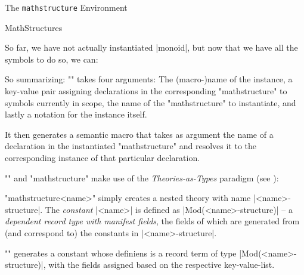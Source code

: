 \begin{sfragment}{The \texttt{mathstructure} Environment}
\begin{smodule}[ns=https://github.com/slatex/sTeX/doc]{MathStructures}

        So far, we have not actually instantiated |monoid|, but now
        that we have all the symbols to do so, we can:

        \begin{function}{\instantiate}
            So summarizing:
            \stexcode"\instantiate" takes four arguments: The 
            (macro-)name of the instance, a key-value pair assigning
            declarations in the corresponding \stexcode"mathstructure"
            to symbols currently in scope, the name of the \stexcode"mathstructure"
            to instantiate, and lastly a notation for the instance itself.

            It then generates a semantic macro that takes as argument
            the name of a declaration in the instantiated \stexcode"mathstructure"
            and resolves it to the corresponding instance of that particular declaration.
        \end{function}

        \begin{mmtbox}
          \stexcode"\instantiate" and \stexcode"mathstructure" make use of the
          \emph{Theories-as-Types} paradigm (see \cite{MueRabKoh:tat18}):

          \stexcode"mathstructure{<name>}" simply creates a nested theory with name
          |<name>-structure|. The \emph{constant} |<name>| is defined as
          |Mod(<name>-structure)| -- a \emph{dependent record type with manifest fields},
          the fields of which are generated from (and correspond to) the constants in
          |<name>-structure|.

          \stexcode"\instantiate" generates a constant whose definiens is a record term of
          type |Mod(<name>-structure)|, with the fields assigned based on the respective
          key-value-list.
        \end{mmtbox}


\end{smodule}
\end{sfragment}
